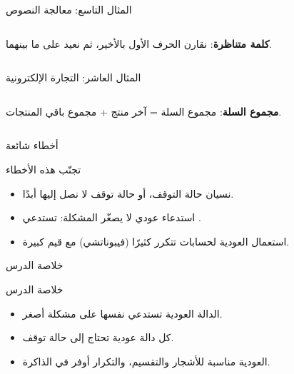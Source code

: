 \documentclass[aspectratio=169, 11pt, t, xcolor={table}]{beamer}
\begin{document}
\begin{frame}[t]{المثال التاسع: معالجة النصوص}
    \begin{columns}[T]
        {\small \textbf{كلمة متناظرة}: نقارن الحرف الأول بالأخير، ثم نعيد على ما بينهما.\par}
        \vspace{0.3cm}
    \end{columns}
\end{frame}

\begin{frame}[t]{المثال العاشر: التجارة الإلكترونية}
    \begin{columns}[T]
        {\small \textbf{مجموع السلة}: مجموع السلة = آخر منتج + مجموع باقي المنتجات.\par}
        \vspace{0.3cm}
    \end{columns}
\end{frame}

\begin{frame}{أخطاء شائعة}
    \begin{obox}{\faExclamationTriangle\quad تجنّب هذه الأخطاء}
        \begin{itemize}
            \item نسيان حالة التوقف، أو حالة توقف لا نصل إليها أبدًا.
            \item استدعاء عودي لا يصغّر المشكلة:  تستدعي .
            \item استعمال العودية لحسابات تتكرر كثيرًا (فيبوناتشي) مع قيم كبيرة.
        \end{itemize}
    \end{obox}
\end{frame}

\begin{frame}{خلاصة الدرس}
    \begin{tbox}{\faCheckCircle\quad خلاصة الدرس}
        \begin{itemize}
            \item الدالة العودية تستدعي نفسها على مشكلة أصغر.
            \item كل دالة عودية تحتاج إلى حالة توقف.
            \item العودية مناسبة للأشجار والتقسيم، والتكرار أوفر في الذاكرة.
        \end{itemize}
    \end{tbox}
\end{frame}
\end{document}
